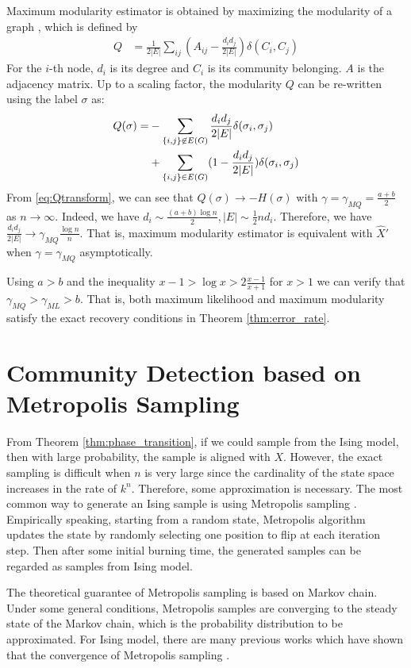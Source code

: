 \documentclass[journal]{IEEEtran}
\newcommand{\1}{\mathbbm{1}}
\begin{document}
Maximum modularity estimator is obtained by maximizing the modularity of a graph \cite{clauset2004finding}, which is defined by
\begin{align}\label{eq:Q}
Q &= \frac{1}{2 |E|} \sum_{ij} (A_{ij} - \frac{d_i d_j}{2 |E|}) \delta(C_i, C_j)
\end{align}
For the $i$-th node, $d_i$ is its degree and $C_i$ is its community belonging. $A$ is the adjacency matrix.
Up to a scaling factor, the modularity $Q$ can be re-written using the label $\sigma$ as:
\begin{align}
Q(\sigma) = &-\sum_{\{i,j\} \not\in E(G) } \frac{d_i d_j}{2 |E|}\delta(\sigma_i,\sigma_j) \notag \\
&+ \sum_{\{i,j\} \in E(G) } (1 - \frac{d_i d_j}{2 |E|}) \delta(\sigma_i,\sigma_j)  \label{eq:Qtransform}
\end{align}
From \eqref{eq:Qtransform}, we can see that $Q(\sigma) \to -H(\sigma)$ with $\gamma = \gamma_{MQ} = \frac{a+b}{2}$ as $n\to \infty$.
Indeed, we have $d_i \sim \frac{(a+b)\log n}{2}, |E| \sim \frac{1}{2}n d_i$. Therefore, we have $\frac{d_id_j}{2|E|} \to \gamma_{MQ} \frac{\log n}{n} $. That is, maximum modularity estimator is equivalent with $\hat{X}'$ when $\gamma = \gamma_{MQ}$ asymptotically.


Using $a>b$ and the inequality $x-1>\log x > 2 \frac{x-1}{x+1}$ for $x>1$ we can verify that $\gamma_{MQ} > \gamma_{ML} > b$. That is, both maximum likelihood and maximum modularity satisfy the exact recovery conditions in Theorem \ref{thm:error_rate}.


\section{Community Detection based on Metropolis Sampling}\label{sec:ms}
From Theorem \ref{thm:phase_transition}, if we could sample from the Ising model, then with large probability, the sample
is aligned with $X$. However, the exact sampling is difficult when $n$ is very large since the cardinality of the state space increases in
the rate of $k^n$. Therefore, some approximation is
necessary. The most common way to generate an Ising sample is using Metropolis sampling \cite{metropolis1953equation}. 
Empirically speaking, starting from a random state, Metropolis algorithm updates the state by randomly selecting one position to flip at each iteration step.
Then after some initial burning time, the generated samples can be regarded as samples from Ising model.

The theoretical guarantee of Metropolis sampling is based on Markov chain. Under some general conditions, Metropolis samples are converging to
the steady state of the Markov chain, which is the probability distribution to be approximated. For Ising model, there are many previous works which have shown that the convergence of Metropolis sampling \cite{diaconis1998we}.
\end{document}
